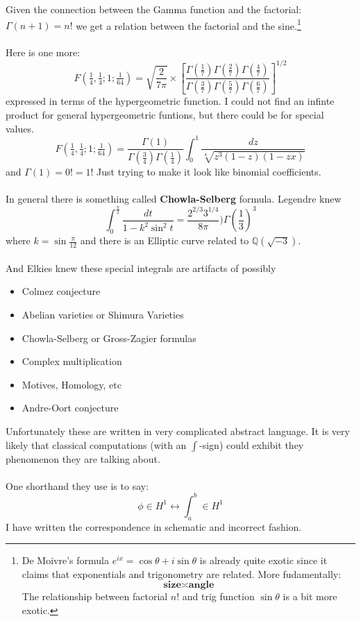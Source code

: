 \documentclass[12pt]{article}
\begin{document}
\noindent Given the connection between the Gamma function and the factorial: $\Gamma(n+1)=n!$ we get a relation between the factorial and the sine.\footnote{De Moivre's formula $ e^{ix} = \cos \theta + i \sin \theta $ is already quite exotic since it claims that exponentials and trigonometry are related.  More fudamentally:
$$ \textbf{size} \asymp \textbf{angle} $$ 
The relationship between factorial $n!$ and trig function $\sin \theta$ is a bit more exotic.} \\ \\
Here is one more:
$$ F( \tfrac{1}{4},\tfrac{1}{4};1;\tfrac{1}{64}) = \sqrt{\frac{2}{7\pi}} \times \left[\frac{ 
\Gamma(\frac{1}{7})\Gamma(\frac{2}{7})\Gamma(\frac{4}{7})
}{
\Gamma(\frac{3}{7})\Gamma(\frac{5}{7})\Gamma(\frac{6}{7})
}\right]^{1/2}$$
expressed in terms of the hypergeometric function.  I could not find an infinte product for general hypergeometric funtions, but there could be for special values.
$$F( \tfrac{1}{4},\tfrac{1}{4};1;\tfrac{1}{64})
= \frac{\Gamma(1)}{\Gamma(\frac{3}{4})\Gamma(\frac{1}{4})} \int_0^1  \frac{dz}{\sqrt[4]{z^3(1-z)(1-zx)}} $$
and $\Gamma(1) = 0! = 1!$ Just trying to make it look like binomial coefficients. \\ \\
In general there is something called \textbf{Chowla-Selberg} formula.  Legendre knew
$$ \int_0^{\frac{\pi}{2}} \frac{dt}{1 - k^2 \sin^2 t}
= \frac{2^{2/3} 3^{1/4}}{8\pi})\Gamma(\frac{1}{3})^3 $$
where $k = \sin \frac{\pi}{12}$ and there is an Elliptic curve related to $\mathbb{Q}(\sqrt{-3})$. \\ \\
And Elkies knew these special integrals are artifacts of possibly
\begin{itemize}
	\item  Colmez conjecture 
	\item  Abelian varieties or Shimura Varieties
	\item  Chowla-Selberg or Gross-Zagier formulas
	\item  Complex multiplication
	\item  Motives, Homology, etc
	\item  Andre-Oort conjecture
\end{itemize}
Unfortunately these are written in very complicated abstract language.   It is very likely that classical computations (with an $\int$-sign) could exhibit they phenomenon they are talking about. \\ \\
One shorthand they use is to say:
$$ \phi \in H^1 \longleftrightarrow \int_a^b  \in H^1   $$
I have written the correspondence in schematic and incorrect fashion.
\end{document}
